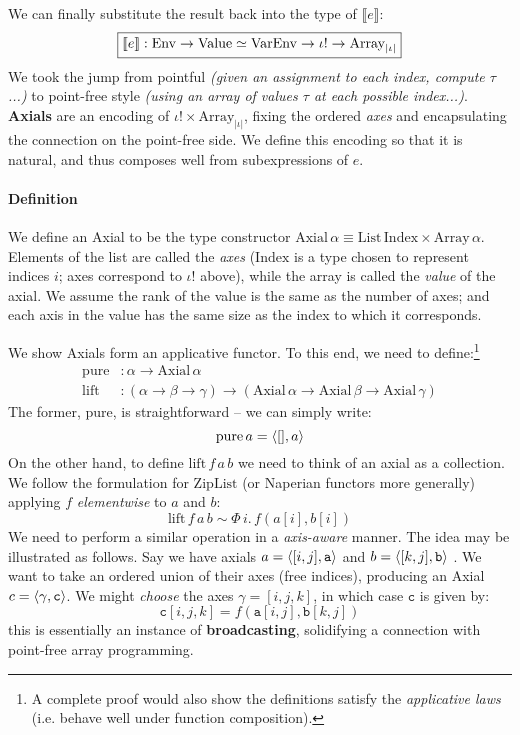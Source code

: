 We can finally substitute the result back into the type of $\llbracket e \rrbracket$:
$$ \boxed{ \llbracket e \rrbracket : \mathrm{Env} \to \mathrm{Value} \simeq \mathrm{VarEnv} \to \iota! \to \mathrm{Array}_{|\iota|} } $$
We took the jump from pointful \textit{(given an assignment to each index, compute $\tau$...)} to point-free style \textit{(using an array of values $\tau$ at each possible index...)}. \textbf{Axials} are an encoding of $\iota! \times \mathrm{Array}_{|\iota|}$, fixing the ordered \textit{axes} and encapsulating the connection on the point-free side. We define this encoding so that it is natural, and thus composes well from subexpressions of $e$.

\needspace{7em}
\paragraph{Definition} 
We define an Axial to be the type constructor $\mathrm{Axial}\,\alpha \equiv \mathrm{List}\,\mathrm{Index} \times \mathrm{Array}\,\alpha$. Elements of the list are called the \textit{axes} ($\mathrm{Index}$ is a type chosen to represent indices $i$; axes correspond to $\iota!$ above), while the array is called the \textit{value} of the axial. We assume the rank of the value is the same as the number of axes; and each axis in the value has the same size as the index to which it corresponds.

We show Axials form an applicative functor. To this end, we need to define:\footnote{A complete proof would also show the definitions satisfy the \textit{applicative laws} (i.e. behave well under function composition).}
\begin{align*}
\mathrm{pure} &: \alpha \to \mathrm{Axial}\,\alpha \\
\mathrm{lift} &: (\alpha \to \beta \to \gamma) \to (\mathrm{Axial}\,\alpha \to \mathrm{Axial}\,\beta \to \mathrm{Axial}\,\gamma) 
\end{align*}
The former, $\mathrm{pure}$, is straightforward -- we can simply write:
$$ \mathrm{pure}\,a = \phipair{[]}{a} $$
On the other hand, to define $\mathrm{lift}\,f\,a\,b$ we need to think of an axial as a collection. We follow the formulation for $\mathrm{ZipList}$ (or Naperian functors \cite{gibbons2016aplicative} more generally) applying $f$ \textit{elementwise} to $a$ and $b$:
$$ \mathrm{lift}\,f\,a\,b \sim \Phi\, i.\, f(a[i], b[i]) $$
We need to perform a similar operation in a \textit{axis-aware} manner. The idea may be illustrated as follows. Say we have axials $a = \phipair{[i, j]}{\texttt{a}}$ and $b = \phipair{[k, j]}{\texttt{b}}$ . We want to take an ordered union of their axes (free indices), producing an Axial $c = \phipair{\gamma}{\texttt{c}}$. We might \textit{choose} the axes $\gamma = [i, j, k]$, in which case $\texttt{c}$ is given by:
$$ \texttt{c}[i, j, k] = f(\texttt{a}[i, j], \texttt{b}[k, j]) $$
this is essentially an instance of \textbf{broadcasting}, solidifying a connection with point-free array programming.

